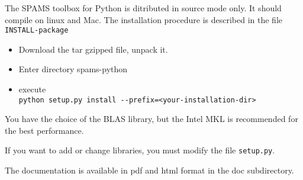 The SPAMS toolbox for Python is ditributed in source mode only.
It should compile on linux and Mac.
The installation procedure is described in the file \verb=INSTALL-package=
\begin{itemize}
\item Download the tar gzipped file, unpack it.
\item Enter directory spams-python
\item execute \\
  \verb;python setup.py install --prefix=<your-installation-dir>;
\end{itemize}

You have the choice of the BLAS library, but the Intel 
MKL is recommended for the best performance.

If you want to add or change libraries, you must modify
the file \verb=setup.py=.

The documentation is available in pdf and html format in the doc subdirectory.
